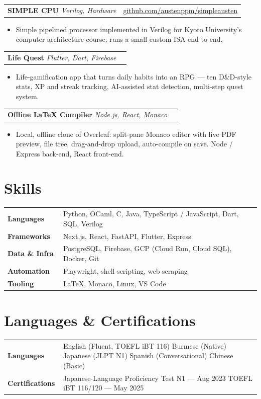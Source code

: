 \documentclass[11pt,a4paper]{article}
\makeatletter
\newcommand{\project}[4]{%
  \noindent
  \begin{tabular*}{\linewidth}{@{\extracolsep{\fill}}l r}
    \textbf{#1} \textcolor{muted}{\textbar{}} \textit{\small #2} & \href{#4}{\small\color{accent} #3}\\
  \end{tabular*}\par\vspace{-2pt}
}
\newenvironment{bullets}
  {\begin{itemize}[leftmargin=1.1em, itemsep=1pt, parsep=0pt, topsep=2pt]}
  {\end{itemize}}
\makeatother
\begin{document}
\project{SIMPLE CPU}{Verilog, Hardware}{github.com/austenppm/simpleausten}{https://github.com/austenppm/simpleausten}
\begin{bullets}
  \item Simple pipelined processor implemented in Verilog for Kyoto University's computer architecture course; runs a small custom ISA end-to-end.
\end{bullets}

\project{Life Quest}{Flutter, Dart, Firebase}{}{}
\begin{bullets}
  \item Life-gamification app that turns daily habits into an RPG --- ten D\&D-style stats, XP and streak tracking, AI-assisted stat detection, multi-step quest system.
\end{bullets}

\project{Offline LaTeX Compiler}{Node.js, React, Monaco}{}{}
\begin{bullets}
  \item Local, offline clone of Overleaf: split-pane Monaco editor with live PDF preview, file tree, drag-and-drop upload, auto-compile on save. Node / Express back-end, React front-end.
\end{bullets}

\section{Skills}

\begin{tabular}{@{}p{0.22\linewidth}@{}p{0.78\linewidth}@{}}
  \textbf{Languages} & Python, OCaml, C, Java, TypeScript / JavaScript, Dart, SQL, Verilog \\
  \textbf{Frameworks} & Next.js, React, FastAPI, Flutter, Express \\
  \textbf{Data \& Infra} & PostgreSQL, Firebase, GCP (Cloud Run, Cloud SQL), Docker, Git \\
  \textbf{Automation} & Playwright, shell scripting, web scraping \\
  \textbf{Tooling} & \LaTeX{}, Monaco, Linux, VS Code \\
\end{tabular}

\section{Languages \& Certifications}

\begin{tabular}{@{}p{0.22\linewidth}@{}p{0.78\linewidth}@{}}
  \textbf{Languages} & English (Fluent, TOEFL iBT 116) \textperiodcentered{} Burmese (Native) \textperiodcentered{} Japanese (JLPT N1) \textperiodcentered{} Spanish (Conversational) \textperiodcentered{} Chinese (Basic) \\
  \textbf{Certifications} & Japanese-Language Proficiency Test N1 --- Aug 2023 \textperiodcentered{} TOEFL iBT 116/120 --- May 2025 \\
\end{tabular}
\end{document}
